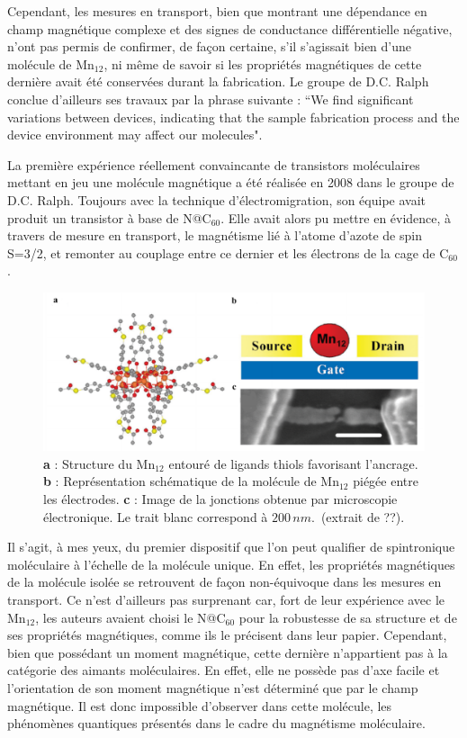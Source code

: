 Cependant, les mesures en transport, bien que montrant une dépendance en champ magnétique complexe et des signes de conductance différentielle négative, n'ont pas permis de confirmer, de façon certaine, s'il s'agissait bien d'une molécule de Mn$_{12}$, ni même de savoir si les propriétés magnétiques de cette dernière avait été conservées durant la fabrication. Le groupe de D.C. Ralph conclue d'ailleurs ses travaux par la phrase suivante : ``We find significant variations between devices, indicating that the sample fabrication process and the device environment may affect our molecules".

La première expérience réellement convaincante de transistors moléculaires mettant en jeu une molécule magnétique a été réalisée en 2008 dans le groupe de D.C. Ralph. Toujours avec la technique d'électromigration, son équipe avait produit un transistor à base de N@C$_{60}$. Elle avait alors pu mettre en évidence, à travers de mesure en transport, le magnétisme lié à l'atome d'azote de spin S=3/2,  et remonter au couplage entre ce dernier et les électrons de la cage de C$_{60}$. 

\begin{figure}
\centering \includegraphics[scale=0.45]{Spintronique/MolSpintro/MolSpintro.pdf}
\caption{\textbf{a} : Structure du Mn$_{12}$ entouré de ligands thiols favorisant l'ancrage. \textbf{b} : Représentation schématique de la molécule de Mn$_{12}$ piégée entre les électrodes. \textbf{c} : Image de la jonctions obtenue par microscopie électronique. Le trait blanc correspond à $200\,nm$.~(extrait de ??).}
\label{MolSpintro}
\end{figure}

Il s'agit, à mes yeux, du premier dispositif que l'on peut qualifier de spintronique moléculaire à l'échelle de la molécule unique. En effet, les propriétés magnétiques de la molécule isolée se retrouvent de façon non-équivoque dans les mesures en transport. Ce n'est d'ailleurs pas surprenant car, fort de leur expérience avec le Mn$_{12}$, les auteurs avaient choisi le N@C$_{60}$ pour la robustesse de sa structure et de ses propriétés magnétiques, comme ils le précisent dans leur papier. Cependant, bien que possédant un moment magnétique, cette dernière n'appartient pas à la catégorie des aimants moléculaires. En effet, elle ne possède pas d'axe facile et l'orientation de son moment magnétique n'est déterminé que par le champ magnétique. Il est donc impossible d'observer dans cette molécule, les phénomènes quantiques présentés dans le cadre du magnétisme moléculaire.

